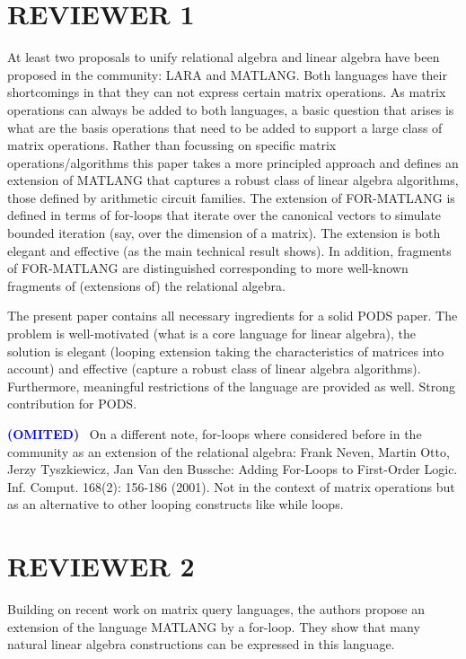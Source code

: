 \documentclass[a4paper]{article}
\newcommand{\cristian}[1]{\todo[inline, color=orange!30]{{\bf Cristian:} #1}}
\newcommand{\OMIT}{\textcolor{blue}{\textbf{(OMITED)}} \ }
\begin{document}
	
\section*{REVIEWER 1}
    
At least two proposals to unify relational algebra and linear algebra have been proposed in the community: LARA and MATLANG.
Both languages have their shortcomings in that they can not express certain matrix operations. As matrix operations can always be 
added to both languages, a basic question that arises is what are the basis operations that need to be added to support a large 
class of matrix operations.  Rather than focussing on specific matrix operations/algorithms this paper takes a more principled 
approach and defines an extension of MATLANG that captures a robust class of linear algebra algorithms, those defined by arithmetic 
circuit families. The extension of FOR-MATLANG is defined in terms of for-loops that iterate over the canonical vectors to simulate 
bounded iteration (say, over the dimension of a matrix). The extension is both elegant and effective (as the main technical result 
shows). In addition, fragments of FOR-MATLANG are distinguished corresponding to more well-known fragments of (extensions of) the 
relational algebra.

The present paper contains all necessary ingredients for a solid PODS paper. The problem is well-motivated (what is a 
core language for linear algebra), the solution is elegant (looping extension taking the characteristics of matrices into 
account) and effective (capture a robust class of linear algebra algorithms). Furthermore, meaningful restrictions of the 
language are provided as well. Strong contribution for PODS.

\OMIT On a different note, for-loops where considered before in the community as an extension of the relational algebra: 
Frank Neven, Martin Otto, Jerzy Tyszkiewicz, Jan Van den Bussche: 
Adding For-Loops to First-Order Logic. Inf. Comput. 168(2): 156-186 (2001). Not in the context of matrix operations but 
as an alternative to other looping constructs like while loops.

\cristian{To discuss.}


\newpage

\section*{REVIEWER 2}

Building on recent work on matrix query languages, the authors
propose an extension of the language MATLANG by a for-loop. They show
that many natural linear algebra constructions can be expressed in
this language.
\end{document}
